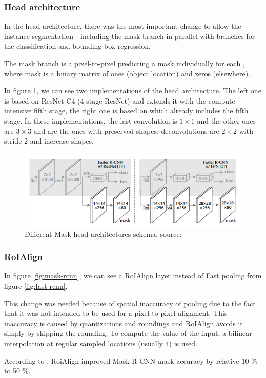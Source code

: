 \subsubsection{Head architecture}
\label{head}

In the head architecture, there was the most important change to allow the 
instance segmentation - including the mask branch in parallel with branches for 
the classification and bounding box regression. 

The mask branch is a pixel-to-pixel  predicting a mask individually for 
each , where mask is a binary matrix of ones (object location) and zeros 
(elsewhere).

In figure \ref{fig:head}, we can see two implementations of the head 
architecture. The left one is based on ResNet-C4 (4 stage ResNet) and extends it 
with the compute-intensive fifth stage, the right one is based on  which 
already includes the fifth stage. In these implementations, the last convolution 
is $1 \times 1$ and the other ones are $3 \times 3$ and are the ones with 
preserved shapes; deconvolutions are $2 \times 2$ with stride 2 and increase 
shapes. 

\begin{figure}[H]
   \centering
	\includegraphics[width=0.7\linewidth]{./pictures/maskrcnn-head.png}
	\caption[Mask R-CNN head architecture]{Different Mask  head 
architectures schema, source: \cite{mask-rcnn}}
      \label{fig:head}
\end{figure}

\subsubsection{RoIAlign}
\label{roialign}

In figure \ref{fig:mask-rcnn}, we can see a RoIAlign layer instead of Fast 
  pooling from figure \ref{fig:fast-rcnn}.

This change was needed because of spatial inaccuracy of  pooling due to 
the fact that it was not intended to be used for a pixel-to-pixel alignment. 
This inaccuracy is caused by quantizations and roundings and RoIAlign avoids it 
simply by skipping the rounding. To compute the value of the input, a bilinear 
interpolation at regular sampled locations (usually 4) is used.

According to \cite{mask-rcnn}, RoiAlign improved Mask R-CNN mask accuracy by 
relative 10 \% to 50 \%.

